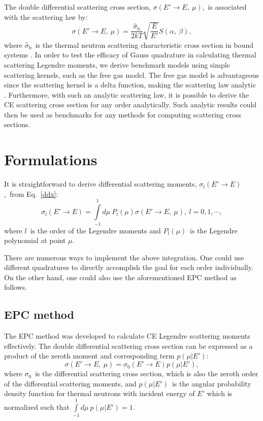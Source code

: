 \documentclass[review]{elsarticle}
\newcommand{\ddxcs}{\sigma(E'\to E,~\mu)}
\newcommand{\dxcs}{\sigma_l(E'\to E)}
\begin{document}
The double differential scattering cross section, $\ddxcs$,~is associated with the scattering law by:
\begin{equation}\label{ddx}
\ddxcs=\frac{\hat{\sigma}_\mathrm{b}}{2kT}\sqrt{\frac{E}{E'}}S(\alpha,~\beta),
\end{equation}
where $\hat{\sigma}_\mathrm{b}$~is the thermal neutron scattering characteristic cross section in bound systems \cite{neutronnews}. In order to test the efficacy of Gauss quadrature in calculating thermal scattering Legendre moments, we derive benchmark models using simple scattering kernels, such as the free gas model. The free gas model is advantageous since the scattering kernel is a delta function, making the scattering law analytic \cite{Macf,IKE}. Furthermore, with such an analytic scattering law, it is possible to derive the CE scattering cross section for any order analytically. Such analytic results could then be used as benchmarks for any methods for computing scattering cross sections.
\section{Formulations}
It is straightforward to derive differential scattering moments, $\dxcs$,~from Eq.~\eqref{ddx}:
\begin{equation}\label{dx}
\dxcs=\int\limits_{-1}^{1}d\mu\ P_l(\mu)\ddxcs,~l=0,1,\cdots,
\end{equation}
where $l$~is the order of the Legendre moments and $P_l(\mu)$~is the Legendre polynomial at point $\mu$.

There are numerous ways to implement the above integration. One could use different quadratures to directly accomplish the goal for each order individually. On the other hand, one could also use the aforementioned EPC method as follows.
\subsection{EPC method}
The EPC method was developed to calculate CE Legendre scattering moments effectively. 
The double differential scattering cross section can be expressed as a product of the zeroth moment and corresponding term $p(\mu|E')$:
\begin{equation}
\ddxcs=\sigma_0(E'\to E)p(\mu|E'),
\end{equation}
where $\sigma_0$~is the differential scattering cross section, which is also the zeroth order of the differential scattering moments, and $p(\mu|E')$~is the angular probability density function for thermal neutrons with incident energy of $E'$ which is normalized such that $\int\limits_{-1}^{1}d\mu\ p(\mu|E')=1$.
\end{document}
